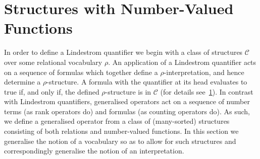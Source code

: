 \documentclass[../main/thesis.tex]{subfiles}
\begin{document}






% 
% 

\section{Structures with Number-Valued Functions}
In order to define a Lindestrom quantifier we begin with a class of structures
$\mathcal{C}$ over some relational vocabulary $\rho$. An application of a
Lindestrom quantifier acts on a sequence of formulas which together define a
$\rho$-interpretation, and hence determine a $\rho$-structure. A formula with
the quantifier at its head evaluates to true if, and only if, the defined
$\rho$-structure is in $\mathcal{C}$ (for details see~\ref{}). In contrast with
Lindestrom quantifiers, generalised operators act on a sequence of number terms
(as rank operators do) and formulas (as counting operators do). As such, we
define a generalised operator from a class of (many-sorted) structures
consisting of both relations and number-valued functions. In this section we
generalise the notion of a vocabulary so as to allow for such structures and
correspondingly generalise the notion of an interpretation.
\end{document}
